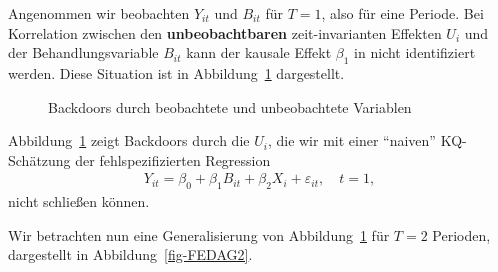 \documentclass[
  a4paper,
  DIV=11,
  oneside]{scrreprt}
\begin{document}
Angenommen wir beobachten \(Y_{it}\) und \(B_{it}\) für \(T=1\), also
für eine Periode. Bei Korrelation zwischen den \textbf{unbeobachtbaren}
zeit-invarianten Effekten \(U_i\) und der Behandlungsvariable \(B_{it}\)
kann der kausale Effekt \(\beta_1\) in nicht identifiziert werden. Diese
Situation ist in Abbildung~\ref{fig-FEDAG1} dargestellt.

\begin{figure}[t]


\caption{\label{fig-FEDAG1}Backdoors durch beobachtete und unbeobachtete
Variablen}

\end{figure}%

Abbildung~\ref{fig-FEDAG1} zeigt Backdoors durch die \(U_i\), die wir
mit einer ``naiven'' KQ-Schätzung der fehlspezifizierten Regression
\begin{align}
  Y_{it} = \beta_0 + \beta_1 B_{it} + \beta_2 X_i + \varepsilon_{it},\quad t=1,\label{eq:femodelfail}
\end{align} nicht schließen können.

Wir betrachten nun eine Generalisierung von Abbildung~\ref{fig-FEDAG1}
für \(T=2\) Perioden, dargestellt in Abbildung~\ref{fig-FEDAG2}.
\end{document}
